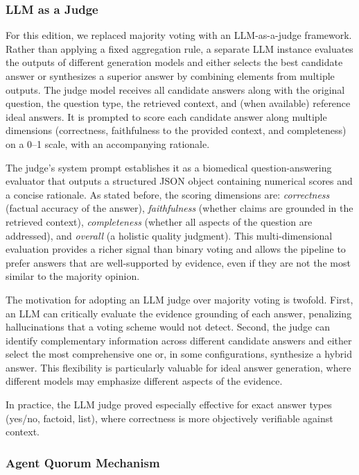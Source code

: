 \subsubsection{LLM as a Judge}
\label{sec:llm-judge}

For this edition, we replaced majority voting with an LLM-as-a-judge framework. Rather than applying a fixed aggregation rule, a separate LLM instance evaluates the outputs of different generation models and either selects the best candidate answer or synthesizes a superior answer by combining elements from multiple outputs. The judge model receives all candidate answers along with the original question, the question type, the retrieved context, and (when available) reference ideal answers. It is prompted to score each candidate answer along multiple dimensions (correctness, faithfulness to the provided context, and completeness) on a 0--1 scale, with an accompanying rationale.

The judge's system prompt establishes it as a biomedical question-answering evaluator that outputs a structured JSON object containing numerical scores and a concise rationale. As stated before, the scoring dimensions are: \emph{correctness} (factual accuracy of the answer), \emph{faithfulness} (whether claims are grounded in the retrieved context), \emph{completeness} (whether all aspects of the question are addressed), and \emph{overall} (a holistic quality judgment). This multi-dimensional evaluation provides a richer signal than binary voting and allows the pipeline to prefer answers that are well-supported by evidence, even if they are not the most similar to the majority opinion.

The motivation for adopting an LLM judge over majority voting is twofold. First, an LLM can critically evaluate the evidence grounding of each answer, penalizing hallucinations that a voting scheme would not detect. Second, the judge can identify complementary information across different candidate answers and either select the most comprehensive one or, in some configurations, synthesize a hybrid answer. This flexibility is particularly valuable for ideal answer generation, where different models may emphasize different aspects of the evidence.

In practice, the LLM judge proved especially effective for exact answer types (yes/no, factoid, list), where correctness is more objectively verifiable against context.

\subsubsection{Agent Quorum Mechanism}

